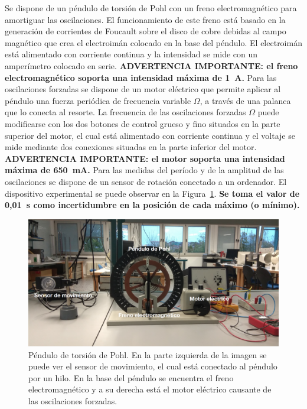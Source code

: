 \documentclass[11pt]{articulo}
\begin{document}
Se dispone de un p\'endulo de torsi\'on de Pohl con un freno electromagn\'etico para amortiguar las oscilaciones. El funcionamiento de este freno est\'a basado en la generaci\'on de corrientes de Foucault sobre el disco de cobre debidas al campo magn\'etico que crea el electroim\'an colocado en la base del p\'endulo. El electroim\'an est\'a alimentado con corriente continua y la intensidad se mide con un amper\'imetro colocado en serie. {\bf ADVERTENCIA IMPORTANTE: el freno electromagn\'etico soporta una intensidad m\'axima de 1~A.} Para las oscilaciones forzadas se dispone de un motor el\'ectrico que permite aplicar al p\'endulo una fuerza peri\'odica de frecuencia variable $\Omega$, a trav\'es de una palanca que lo conecta al resorte. La frecuencia de las oscilaciones forzadas $\Omega$ puede modificarse con los dos botones de control grueso y fino situados en la parte superior del motor, el cual est\'a alimentado con corriente continua y el voltaje se mide mediante dos conexiones situadas en la parte inferior del motor. {\bf ADVERTENCIA IMPORTANTE: el motor soporta una intensidad m\'axima de 650~mA.} Para las medidas del per\'iodo y de la amplitud de las oscilaciones se dispone de un sensor de rotaci\'on conectado a un ordenador. El dispositivo experimental se puede observar en la Figura~\ref{pohl}. {\bf Se toma el valor de 0,01~s como incertidumbre en la posici\'on de cada m\'aximo (o m\'inimo).}
%
\begin{figure}[htb]
\begin{center}
\hspace*{0.0cm}
\includegraphics[width=1.0\textwidth]{figuras/pohl_Figura_1b.png}
\end{center}
\vspace*{-0.6cm}
\caption[]{\label{pohl}{P\'endulo de torsi\'on de Pohl. En la parte izquierda de la imagen se puede ver el sensor de movimiento, el cual est\'a conectado al p\'endulo por un hilo. En la base del p\'endulo se encuentra el freno electromagn\'etico y a su derecha est\'a el motor el\'ectrico causante de las oscilaciones forzadas.}}
\end{figure}
\end{document}
